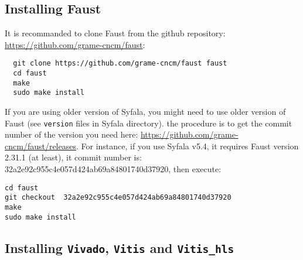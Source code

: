 \subsection{Installing Faust}
\label{faust-install}
It is recommanded to clone Faust from the github repository: \url{https://github.com/grame-cncm/faust}:
\begin{verbatim}
  git clone https://github.com/grame-cncm/faust faust
  cd faust
  make
  sudo make install
\end{verbatim}
If you are using older version of Syfala, you might need to use older version of Faust (see {\tt version} files in Syfala directory). the procedure is to get the commit number of the version you need here: \url{https://github.com/grame-cncm/faust/releases}. For instance, if you use Syfala v5.4, it requires Faust version 2.31.1 (at least), it commit number is:  32a2e92c955c4e057d424ab69a84801740d37920, then execute:
\begin{verbatim}
cd faust 
git checkout  32a2e92c955c4e057d424ab69a84801740d37920
make 
sudo make install
\end{verbatim}

\subsection{Installing {\tt Vivado}, {\tt Vitis} and {\tt Vitis\_hls} }
\label{vitis-install}



